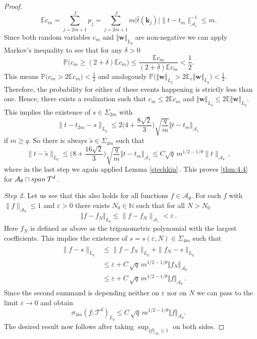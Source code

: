 \documentclass[11pt,reqno]{article}
\numberwithin{equation}{section}
\theoremstyle{definition}
\theoremstyle{plain}
\newcommand{\N}{\ensuremath{\mathbb{N}}}
\newcommand{\E}{\ensuremath{\mathbb{E}}}
\newcommand{\p}{\ensuremath{\mathbb{P}}}
\newcommand{\ca}{\ensuremath{\mathcal A}}
\newcommand{\bk}{\ensuremath{\mathbf k}}
\newcommand{\bw}{\ensuremath{\mathbf w}}
\newcommand{\Span}{{\rm span \, }}
\newcommand{\be}{\begin{equation}}
\newcommand{\ee}{\end{equation}}
\begin{document}
\begin{proof}
\begin{equation}
    \E c_m = \sum_{j=2m+1}^J p_j = \sum_{j=2m+1}^J m \vert \hat{t}(\bk_j) \vert\|t-t_m\|_{\ca_1}^{-1} \leq m.
\end{equation}
Since both random variables \(c_m\) and \(\Vert \bw \Vert_{L_q}\) are non-negative we can apply Markov's inequality to see that for any \(\delta > 0\)
\begin{equation}
    \p\big( c_m \geq (2+\delta) \E c_m \big) \leq \frac{\E c_m}{(2+\delta) \E c_m} < \frac{1}{2}.
\end{equation} 
This means  \(\p \big(c_m > 2 \E c_m) < \frac{1}{2} \) and analogously \(\p \big(\Vert \bw\Vert_{L_q} > 2 \E_v \Vert \bw\Vert_{L_q}) < \frac{1}{2} \). Therefore, the probability for either of these events happening is strictly less than one. Hence, there exists a realization  such that \(c_m \leq 2 \E c_m \) and \( \Vert \bw \Vert_{L_q} \leq 2 \E \Vert \bw \Vert_{L_q}\). 
This implies the existence of $s \in \Sigma_{2m}$ with 
\begin{equation}
    \|t-t_{2m}-s\|_{L_q} \leq 2\Big(4 + \frac{8\sqrt{2}}{3} \Big)  \sqrt{\frac{q}{m}} \Vert t-t_m \Vert_{\ca_1}\,
\end{equation} 
if $m\geq q$. So there is always $\tilde{s} \in \Sigma_{4m}$ such that
$$
    \|t-\tilde{s}\|_{L_q} \leq \Big(8 + \frac{16\sqrt{2}}{3} \Big) \sqrt{\frac{q}{m}} \Vert t-t_m \Vert_{\ca_1} \leq C \sqrt{q}\,m^{1/2-1/\theta}\|t\|_{\ca_\theta}\,,
$$
where in the last step we again applied Lemma \ref{stechkin}\,. This proves \eqref{thm:4.4} for $\ca_\theta \cap \Span \mathcal{T}^d$\,.

{\em Step 2. }Let us see that this also holds for all functions \(f \in \ca_\theta\). For each  \(f\) with $\|f\|_{\ca_\theta} \leq 1$ and \(\varepsilon >0\) there exists \(N_0 \in \N\) such that for all \(N > N_0\)
\be
\Vert f-f_N\Vert_{L_q} \leq \|f-f_N\|_{\ca_1} < \varepsilon\,.
\ee
Here $f_N$ is defined as above as the trigonometric polynomial with the largest coefficients. 
This implies the existence of $s = s(\varepsilon,N) \in \Sigma_{4m}$ such that   
\begin{align}
\begin{split}
\|f-s\|_{L_q} &\leq  \|f-f_N\|_{L_q}  + \|f_N-s\|_{L_q} \\
& \leq \varepsilon + C \, \sqrt{q} \, m^{1/2-1/\theta} \Vert f_N \Vert_{\ca_\theta} \\
& \leq \varepsilon +C \, \sqrt{q} \, m^{1/2-1/\theta} \Vert f \Vert_{\ca_\theta}\,. 
\end{split}
\end{align}
Since the second summand is depending neither on $\varepsilon$ nor on $N$ we can pass to the limit $\varepsilon \to 0$ and obtain
$$
    \sigma_{4m}(f;\mathcal{T}^d)_{L_q}\leq  C \, \sqrt{q} \, m^{1/2-1/\theta} \Vert f \Vert_{\ca_\theta}.
$$ The desired result now follows after taking \(\sup_{\Vert f \Vert_{\ca_\theta} \leq 1}\) on both sides. \bigskip


\end{proof}
\end{document}
